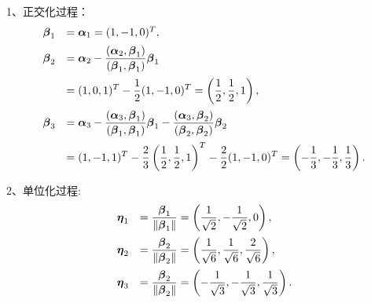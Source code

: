 \begin{frame}[allowframebreaks]\ft{\secname}

  \begin{jie}
    1、正交化过程：
$$
\begin{array}{rl}
  \boldsymbol{\beta}_1&=\boldsymbol{\alpha}_1=(1,-1,0)^T, \\[0.2cm]
  \boldsymbol{\beta}_2&\displaystyle=\boldsymbol{\alpha}_2-\frac{(\boldsymbol{\alpha}_2,\boldsymbol{\beta}_1)}{(\boldsymbol{\beta}_1,\boldsymbol{\beta}_1)}\boldsymbol{\beta}_1\\[0.4cm]
           &\displaystyle=(1,0,1)^T-\frac12(1,-1,0)^T=\left(\frac12,\frac12,1\right),\\[0.4cm]
  \boldsymbol{\beta}_3&\displaystyle=\boldsymbol{\alpha}_3-\frac{(\boldsymbol{\alpha}_3,\boldsymbol{\beta}_1)}{(\boldsymbol{\beta}_1,\boldsymbol{\beta}_1)}\boldsymbol{\beta}_1
             -\frac{(\boldsymbol{\alpha}_3,\boldsymbol{\beta}_2)}{(\boldsymbol{\beta}_2,\boldsymbol{\beta}_2)}\boldsymbol{\beta}_2\\[0.4cm]
           &\displaystyle=(1,-1,1)^T-\frac23\left(\frac12,\frac12,1\right)^T-\frac22(1,-1,0)^T=\left(-\frac13,-\frac13,\frac13\right).
\end{array}
$$


2、单位化过程:
$$
\begin{array}{rl}
  \boldsymbol{\eta}_1&\displaystyle =\frac{\boldsymbol{\beta}_1}{\|\boldsymbol{\beta}_1\|}=\left(\frac1{\sqrt{2}},-\frac1{\sqrt{2}},0\right),\\[0.4cm]
  \boldsymbol{\eta}_2&\displaystyle =\frac{\boldsymbol{\beta}_2}{\|\boldsymbol{\beta}_2\|}=\left(\frac1{\sqrt{6}},\frac1{\sqrt{6}},\frac2{\sqrt{6}}\right),\\[0.4cm]
  \boldsymbol{\eta}_3&\displaystyle =\frac{\boldsymbol{\beta}_2}{\|\boldsymbol{\beta}_2\|}=\left(-\frac1{\sqrt{3}},-\frac1{\sqrt{3}},\frac1{\sqrt{3}}\right).
\end{array}
$$
\end{jie}

\end{frame}